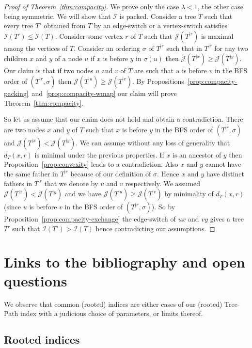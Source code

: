 \documentclass[11 pt]{modarticle}
\newcommand{\distance}[3]{d_{#3}(#1,#2)}
\newcommand{\rtree}[2]{{#1}^{\lvert #2}}
\newcommand{\ortree}[3]{(\rtree{#1}{#2},{#3})}
\newcommand{\indexsymbol}{\mathcal{I}}
\newcommand{\tindex}[1]{\indexsymbol(#1)}
\newcommand{\rindexsymbol}{\mathcal{J}}
\newcommand{\rindex}[2]{\rindexsymbol(\rtree{#2}{#1})}
\begin{document}
\begin{proof}[Proof of Theorem~\ref{thm:compacity}]
We prove only the case $\lambda < 1$, the other case being symmetric. We will show that $\indexsymbol$ is packed. Consider a tree $T$ such that every tree $T'$ obtained from $T$ by an edge-switch or a vertex-switch satisfies $\tindex{T'} \leq \tindex{T}$. Consider some vertex $r$ of $T$ such that $\rindex{r}{T}$ is maximal among the vertices of $T$. Consider an ordering $\sigma$ of $\rtree{T}{r}$ such that in $\rtree{T}{r}$ for any two children $x$ and $y$ of a node $u$ if $x$ is before $y$ in $\sigma(u)$ then $\rindex{x}{T} \geq \rindex{y}{T}$. Our claim is that if two nodes $u$ and $v$ of $T$ are such that $u$ is before $v$ in the BFS order of $\ortree{T}{r}{\sigma}$ then $\rindex{u}{T} \geq \rindex{v}{T}$. By Propositions~\ref{prop:compacity-packing}~and~\ref{prop:compacity-wmap} our claim will prove Theorem~\ref{thm:compacity}.

So let us assume that our claim does not hold and obtain a contradiction. There are two nodes $x$ and $y$ of $T$ such that $x$ is before $y$ in the BFS order of $\ortree{T}{r}{\sigma}$ and $\rindex{x}{T} < \rindex{y}{T}$. We can assume without any loss of generality that $\distance{x}{r}{T}$ is minimal under the previous properties. If $x$ is an ancestor of $y$ then Proposition~\ref{prop:convexity} leads to a contradiction. Also $x$ and $y$ cannot have the same father in $\rtree{T}{r}$ because of our definition of $\sigma$. Hence $x$ and $y$ have distinct fathers in $\rtree{T}{r}$ that we denote by $u$ and $v$ respectively. We assumed $\rindex{x}{T} < \rindex{y}{T}$ and we have $\rindex{u}{T} \geq \rindex{v}{T}$ by minimality of $\distance{x}{r}{T}$ (since $u$ is berfore $v$ in the BFS order of $\ortree{T}{r}{\sigma}$). So by Proposition~\ref{prop:compacity-exchange} the edge-switch of $ux$ and $vy$ gives a tree $T'$ such that $\tindex{T'} > \tindex{T}$ hence contradicting our assumptions.
\end{proof}

\section{Links to the bibliography and open questions}\label{section:links}

We observe that common (rooted) indices are either cases of our (rooted) Tree-Path index with a judicious choice of parameters, or limits thereof.

\subsection{Rooted indices}
\end{document}
